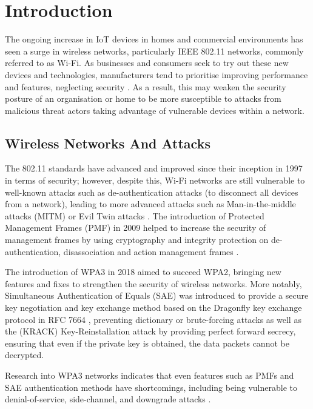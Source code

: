 
\section{Introduction}
\label{sec:Introduction} 

The ongoing increase in IoT devices in homes and commercial environments has seen a
surge in wireless networks, particularly IEEE 802.11 networks, commonly referred to as Wi-Fi. As businesses and consumers seek to try out these new devices and technologies, manufacturers tend to prioritise improving performance and features, neglecting security \parencite{roundy_iot_nodate}. As a result, this may weaken the security posture of an organisation or home to be more susceptible to attacks from malicious threat actors taking advantage of vulnerable devices within a network.

\subsection{Wireless Networks And Attacks}
\smallskip

The 802.11 standards have advanced and improved since their inception in 1997 in terms of security; however, despite this, Wi-Fi networks are still vulnerable to well-known attacks such as de-authentication attacks (to disconnect all devices from a network), leading to more advanced attacks such as Man-in-the-middle attacks (MITM) or Evil Twin attacks \parencites{DBLP:journals/corr/abs-2105-15103}. The introduction of Protected Management Frames (PMF) in 2009 \parencite{5278657} helped to increase the security of management frames by using cryptography and integrity protection on de-authentication, disassociation and action management frames \parencite{9249426}. 

The introduction of WPA3 in 2018 \parencite{wifialliance_2022_wpa3} aimed to succeed WPA2, bringing new features and fixes to strengthen the security of wireless networks. More notably, Simultaneous Authentication of Equals (SAE) was introduced to provide a secure key negotiation and key exchange method based on the Dragonfly key exchange protocol in RFC 7664 \parencite{rfc7664}, preventing dictionary or brute-forcing attacks as well as the (KRACK) Key-Reinstallation attack \parencite{krack} by providing perfect forward secrecy, ensuring that even if the private key is obtained, the data packets cannot be decrypted. 

Research into WPA3 networks indicates that even features such as PMFs and SAE authentication methods have shortcomings, including being vulnerable to denial-of-service, side-channel, and downgrade attacks \parencite{vanhoef-sp2020-dragonblood}.


